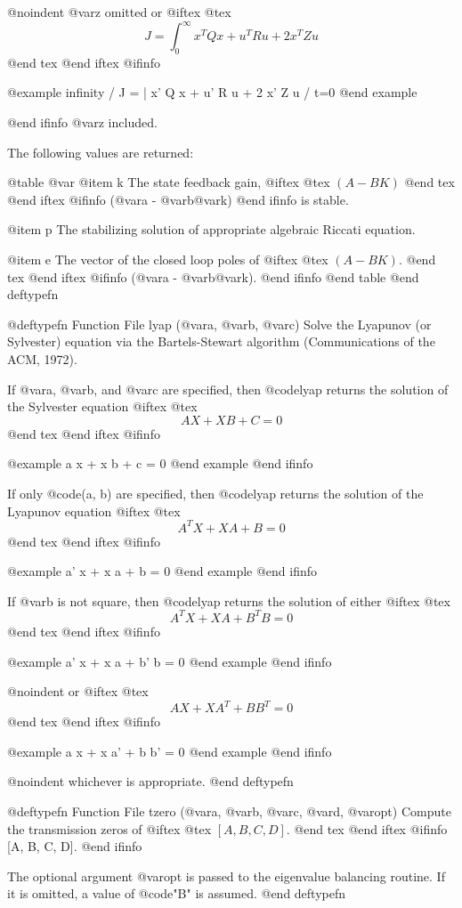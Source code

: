 @noindent
@var{z} omitted or
@iftex
@tex
$$
 J = \int_0^\infty x^T Q x + u^T R u + 2 x^T Z u
$$
@end tex
@end iftex
@ifinfo

@example
      infinity
      /
  J = |  x' Q x + u' R u + 2 x' Z u
     /
    t=0
@end example

@end ifinfo
@var{z} included.

The following values are returned:

@table @var
@item k
The state feedback gain,
@iftex
@tex
$(A - B K)$
@end tex
@end iftex
@ifinfo
(@var{a} - @var{b}@var{k})
@end ifinfo
is stable.

@item p
The stabilizing solution of appropriate algebraic Riccati equation.

@item e
The vector of the closed loop poles of
@iftex
@tex
$(A - B K)$.
@end tex
@end iftex
@ifinfo
(@var{a} - @var{b}@var{k}).
@end ifinfo
@end table
@end deftypefn

@deftypefn {Function File} {} lyap (@var{a}, @var{b}, @var{c})
Solve the Lyapunov (or Sylvester) equation via the Bartels-Stewart
algorithm (Communications of the ACM, 1972).

If @var{a}, @var{b}, and @var{c} are specified, then @code{lyap} returns
the solution of the  Sylvester equation
@iftex
@tex
$$
 A X + X B + C = 0
$$
@end tex
@end iftex
@ifinfo

@example
a x + x b + c = 0
@end example
@end ifinfo

If only @code{(a, b)} are specified, then @code{lyap} returns the
solution of the Lyapunov equation
@iftex
@tex
$$
 A^T X + X A + B = 0
$$
@end tex
@end iftex
@ifinfo

@example
a' x + x a + b = 0
@end example
@end ifinfo

If @var{b} is not square, then @code{lyap} returns the solution of either
@iftex
@tex
$$
 A^T X + X A + B^T B = 0
$$
@end tex
@end iftex
@ifinfo

@example
a' x + x a + b' b = 0
@end example
@end ifinfo

@noindent
or
@iftex
@tex
$$
 A X + X A^T + B B^T = 0
$$
@end tex
@end iftex
@ifinfo

@example
a x + x a' + b b' = 0
@end example
@end ifinfo

@noindent
whichever is appropriate.
@end deftypefn

@deftypefn {Function File} {} tzero (@var{a}, @var{b}, @var{c}, @var{d}, @var{opt})
Compute the transmission zeros of
@iftex
@tex
$[A, B, C, D]$.
@end tex
@end iftex
@ifinfo
[A, B, C, D].
@end ifinfo

The optional argument @var{opt} is passed to the eigenvalue balancing
routine.  If it is omitted, a value of @code{"B"} is assumed.
@end deftypefn
